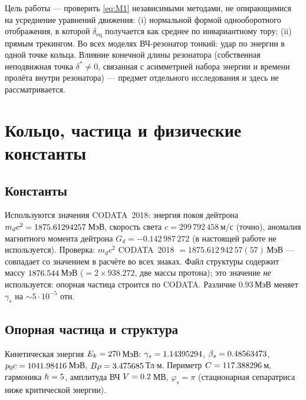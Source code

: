 \documentclass[a4paper,11pt]{article}
\newcommand{\deq}{\delta_{\mathrm{eq}}}
\begin{document}
Цель работы --- проверить \eqref{eq:M1} независимыми методами, не опирающимися на усреднение уравнений движения: (i) нормальной формой однооборотного отображения, в которой $\deq$ получается как среднее по инвариантному тору; (ii) прямым трекингом. Во всех моделях ВЧ-резонатор тонкий: удар по энергии в одной точке кольца. Влияние конечной длины резонатора (собственная неподвижная точка $\delta^\ast\ne0$, связанная с асимметрией набора энергии и времени пролёта внутри резонатора) --- предмет отдельного исследования и здесь не рассматривается.

\section{Кольцо, частица и физические константы}
\subsection{Константы}
Используются значения CODATA~2018: энергия покоя дейтрона $m_dc^2=1875.61294257$\,МэВ, скорость света $c=299\,792\,458$\,м/с (точно), аномалия магнитного момента дейтрона $G_d=-0.142\,987\,272$ (в настоящей работе не используется). Проверка: $m_dc^2$ CODATA~2018 $=1875.612\,942\,57(57)$\,МэВ --- совпадает со значением в расчёте во всех знаках. Файл структуры содержит массу $1876.544$\,МэВ ($=2\times938.272$, две массы протона); это значение \emph{не} используется: опорная частица строится по CODATA. Различие $0.93$\,МэВ меняет $\gamma_s$ на $\sim5\cdot10^{-5}$ отн.

\subsection{Опорная частица и структура}
Кинетическая энергия $E_k=270$\,МэВ: $\gamma_s=1.14395294$, $\beta_s=0.48563473$, $p_0c=1041.98416$\,МэВ, $B\rho=3.475685$\,Тл$\cdot$м. Периметр $C=117.388296$\,м, гармоника $h=5$, амплитуда ВЧ $V=0.2$\,МВ, $\varphi_s=\pi$ (стационарная сепаратриса ниже критической энергии).
\end{document}
